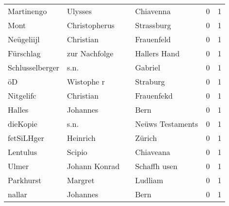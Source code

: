 \documentclass[10pt,a4paper,landscape]{article}
\begin{document}
\begin{longtable}{llllrr}
               Martinengo &                            Ulysses &             &                                   Chiavenna &          0 &         1 \\
                     Mont &                      Christopherus &             &                                  Strassburg &          0 &         1 \\
               Neügeliijl &                          Christian &             &                                  Frauenfeld &          0 &         1 \\
                Fürschlag &                      zur Nachfolge &             &                                Hallers Hand &          0 &         1 \\
          Schlusselberger &                               s.n. &             &                                     Gabriel &          0 &         1 \\
                       öD &                         Wistophe r &             &                                    Straburg &          0 &         1 \\
                Nitgelifc &                          Christian &             &                                  Frauenfekd &          0 &         1 \\
                   Halles &                           Johannes &             &                                        Bern &          0 &         1 \\
                 dieKopie &                               s.n. &             &                            Neüws Testaments &          0 &         1 \\
               fetSiLHger &                           Heinrich &             &                                      Zürich &          0 &         1 \\
                 Lentulus &                             Scipio &             &                                   Chiaveana &          0 &         1 \\
                    Ulmer &                      Johann Konrad &             &                                Schaffh usen &          0 &         1 \\
                Parkhurst &                            Margret &             &                                     Ludliam &          0 &         1 \\
                   nallar &                           Johannes &             &                                        Bern &          0 &         1 \\

\end{longtable}
\end{document}
